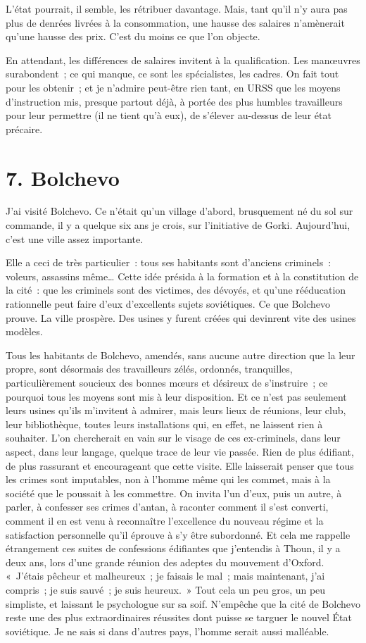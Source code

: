 \documentclass[french,twoside]{book} %
\begin{document}
L’état pourrait, il semble, les rétribuer davantage. Mais, tant qu’il n’y aura pas plus de denrées livrées à la consommation, une hausse des salaires n’amènerait qu’une hausse des prix. C’est du moins ce que l’on objecte.\par
En attendant, les différences de salaires invitent à la qualification. Les manœuvres surabondent ; ce qui manque, ce sont les spécialistes, les cadres. On fait tout pour les obtenir ; et je n’admire peut-être rien tant, en URSS que les moyens d’instruction mis, presque partout déjà, à portée des plus humbles travailleurs pour leur permettre (il ne tient qu’à eux), de s’élever au-dessus de leur état précaire.

\section[{7. Bolchevo}]{7. Bolchevo}

\noindent J’ai visité Bolchevo. Ce n’était qu’un village d’abord, brusquement né du sol sur commande, il y a quelque six ans je crois, sur l’initiative de Gorki. Aujourd’hui, c’est une ville assez importante.\par
Elle a ceci de très particulier : tous ses habitants sont d’anciens criminels : voleurs, assassins même… Cette idée présida à la formation et à la constitution de la cité : que les criminels sont des victimes, des dévoyés, et qu’une rééducation rationnelle peut faire d’eux d’excellents sujets soviétiques. Ce que Bolchevo prouve. La ville prospère. Des usines y furent créées qui devinrent vite des usines modèles.\par
Tous les habitants de Bolchevo, amendés, sans aucune autre direction que la leur propre, sont désormais des travailleurs zélés, ordonnés, tranquilles, particulièrement soucieux des bonnes mœurs et désireux de s’instruire ; ce pourquoi tous les moyens sont mis à leur disposition. Et ce n’est pas seulement leurs usines qu’ils m’invitent à admirer, mais leurs lieux de réunions, leur club, leur bibliothèque, toutes leurs installations qui, en effet, ne laissent rien à souhaiter. L’on chercherait en vain sur le visage de ces ex-criminels, dans leur aspect, dans leur langage, quelque trace de leur vie passée. Rien de plus édifiant, de plus rassurant et encourageant que cette visite. Elle laisserait penser que tous les crimes sont imputables, non à l’homme même qui les commet, mais à la société que le poussait à les commettre. On invita l’un d’eux, puis un autre, à parler, à confesser ses crimes d’antan, à raconter comment il s’est converti, comment il en est venu à reconnaître l’excellence du nouveau régime et la satisfaction personnelle qu’il éprouve à s’y être subordonné. Et cela me rappelle étrangement ces suites de confessions édifiantes que j’entendis à Thoun, il y a deux ans, lors d’une grande réunion des adeptes du mouvement d’Oxford. « J’étais pêcheur et malheureux ; je faisais le mal ; mais maintenant, j’ai compris ; je suis sauvé ; je suis heureux. » Tout cela un peu gros, un peu simpliste, et laissant le psychologue sur sa soif. N’empêche que la cité de Bolchevo reste une des plus extraordinaires réussites dont puisse se targuer le nouvel État soviétique. Je ne sais si dans d’autres pays, l’homme serait aussi malléable.
\end{document}
